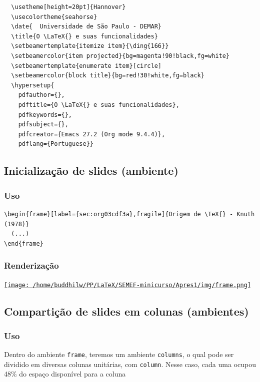 \documentclass[11pt]{article}
\begin{document}
\begin{verbatim}
  \usetheme[height=20pt]{Hannover}
  \usecolortheme{seahorse}
  \date{  Universidade de São Paulo - DEMAR}
  \title{O \LaTeX{} e suas funcionalidades}
  \setbeamertemplate{itemize item}{\ding{166}}
  \setbeamercolor{item projected}{bg=magenta!90!black,fg=white}
  \setbeamertemplate{enumerate item}[circle]
  \setbeamercolor{block title}{bg=red!30!white,fg=black}
  \hypersetup{
    pdfauthor={},
    pdftitle={O \LaTeX{} e suas funcionalidades},
    pdfkeywords={},
    pdfsubject={},
    pdfcreator={Emacs 27.2 (Org mode 9.4.4)}, 
    pdflang={Portuguese}}
\end{verbatim}

\subsection{Inicialização de slides (ambiente)}
\label{sec:org4078fff}
\subsubsection{Uso}
\label{sec:org6223350}
\begin{verbatim}
\begin{frame}[label={sec:org03cdf3a},fragile]{Origem de \TeX{} - Knuth (1978)}
  (...)
\end{frame}
\end{verbatim}

\subsubsection{Renderização}
\label{sec:orgb13ecb0}
\href{img/frame.png}{\texttt{[image: /home/buddhilw/PP/LaTeX/SEMEF-minicurso/Apres1/img/frame.png]}}

\subsection{Compartição de slides em colunas (ambientes)}
\label{sec:org016b584}
\subsubsection{Uso}
\label{sec:org74b0016}

Dentro do ambiente \texttt{frame}, teremos um ambiente \texttt{columns}, o qual pode
ser dividido em diversas colunas unitárias, com  \texttt{column}. Nesse caso,
cada uma ocupou 48\% do espaço disponível para a coluna
\end{document}
